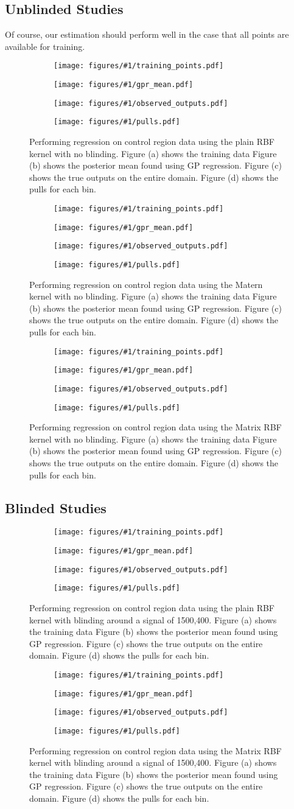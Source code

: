 \documentclass[10pt]{article}
\theoremstyle{definition}
\begin{document}
\newcommand{\makegrid}[3]{
  \begin{figure}[ht]
    \centering
    \begin{subfigure}[b]{0.45\textwidth}
      \centering
      \texttt{[image: figures/\#1/training\_points.pdf]}
      \caption{}
    \end{subfigure}
    \begin{subfigure}[b]{0.45\textwidth}
      \centering
      \texttt{[image: figures/\#1/gpr\_mean.pdf]}
      \caption{}
    \end{subfigure}
    \begin{subfigure}[b]{0.45\textwidth}
      \centering
      \texttt{[image: figures/\#1/observed\_outputs.pdf]}
      \caption{}
    \end{subfigure}
    \begin{subfigure}[b]{0.45\textwidth}
      \centering
      \texttt{[image: figures/\#1/pulls.pdf]}
      \caption{}
    \end{subfigure}
    \caption{Performing regression on control region data using the #2 kernel with #3.
      Figure (a) shows the training data
      Figure (b) shows the posterior mean found using GP regression.
      Figure (c) shows the true outputs on the entire domain.
      Figure (d) shows the pulls for each bin.}
  \end{figure}
}

\subsection{Unblinded Studies}
Of course, our estimation should perform well in the case that all points are available for training. 
\makegrid{pure_rbf}{plain RBF}{no blinding}
\makegrid{matern}{Matern}{no blinding}
\makegrid{matrix_rbf}{Matrix RBF}{no blinding}

\subsection{Blinded Studies}

\makegrid{pure_rbf_window_1300_1500__0p55_0p65}{plain RBF}{blinding around a signal of 1500,400}
\makegrid{matrix_rbf_window_1300_1500__0p55_0p65}{Matrix RBF}{blinding around a signal of 1500,400}
\end{document}
